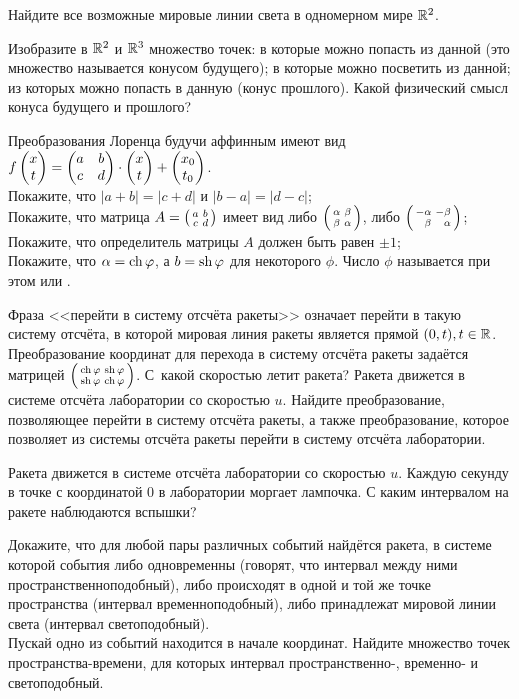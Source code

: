 \documentclass[a4paper,12pt]{article}
\newcommand{\smat}[1]{\hr{\begin{smallmatrix}#1\end{smallmatrix}}}
\newcommand{\мв}{\,м$_в$\xspace}
\begin{document}
Найдите все возможные мировые линии света в одномерном мире $\mathbb{R}^2$.

Изобразите в $\mathbb{R}^2$ и $\mathbb{R}^3$ множество точек:
 в которые можно попасть из данной (это множество называется  конусом  будущего);
 в которые можно посветить из данной;
 из которых можно попасть в данную ( конус  прошлого). Какой физический смысл конуса будущего и прошлого?


Преобразования Лоренца будучи аффинным имеют вид $f\begin{pmatrix}x\\t\end{pmatrix} = \begin{pmatrix}a&b\\c&d\end{pmatrix}\cdot\begin{pmatrix}x\\t\end{pmatrix}+\begin{pmatrix}x_0\\t_0\end{pmatrix}$.
\\
Покажите, что $|a+b|=|c+d|$ и $|b-a|=|d-c|$;
\\
Покажите, что матрица $A=\smat{a&b\\c&d}$ имеет вид либо $\smat{\al&\be\\\be&\al}$, либо $\smat{-\al&-\be\\\phantom{-}\be&\phantom{-}\al}$;
\\
Покажите, что определитель матрицы $A$ должен быть равен $\pm1$;
\\
Покажите, что $\al=\ch\phi$, а $b=\sh\phi$ для некоторого $\phi$.
Число $\phi$ называется при этом  или .


Фраза <<перейти в систему отсчёта ракеты>> означает перейти в такую систему отсчёта,
в которой мировая линия ракеты является прямой $(0,t), t\in\mathbb{R}$.
\\
Преобразование координат для перехода в систему отсчёта ракеты задаётся матрицей $\smat{\ch\ph&\sh\ph\\\sh\ph&\ch\ph}$.
С~какой скоростью летит ракета?
Ракета движется в системе отсчёта лаборатории со скоростью $u$.
Найдите преобразование, позволяющее перейти в систему отсчёта ракеты,
а также преобразование, которое позволяет из системы отсчёта ракеты перейти в систему отсчёта лаборатории.



Ракета движется в системе отсчёта лаборатории со скоростью $u$.
Каждую секунду в точке с координатой 0 в лаборатории моргает лампочка.
С каким интервалом на ракете наблюдаются вспышки?


Докажите, что для любой пары различных событий найдётся ракета, в системе которой события либо одновременны (говорят, что интервал между ними  пространственноподобный), либо происходят в одной и той же точке пространства (интервал временноподобный), либо принадлежат мировой линии света (интервал  светоподобный).
\\
Пускай одно из событий находится в начале координат.
Найдите множество точек пространства-времени, для которых интервал пространственно-, временно- и светоподобный.
\end{document}
